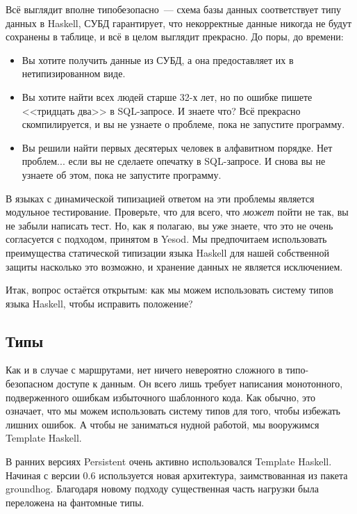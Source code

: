 Всё выглядит вполне типобезопасно~--- схема базы данных соответствует типу
данных в Haskell, СУБД гарантирует, что некорректные данные никогда не будут
сохранены в таблице, и всё в целом выглядит прекрасно. До поры, до времени:
\begin{itemize}
  \item Вы хотите получить данные из СУБД, а она предоставляет их в
      нетипизированном виде.

  \item Вы хотите найти всех людей старше 32-х лет, но по ошибке пишете
      <<тридцать два>> в SQL-запросе. И знаете что? Всё прекрасно
      скомпилируется, и вы не узнаете о проблеме, пока не запустите программу.

  \item Вы решили найти первых десятерых человек в алфавитном порядке. Нет
      проблем... если вы не сделаете опечатку в SQL-запросе. И снова вы не
      узнаете об этом, пока не запустите программу.
\end{itemize}

В языках с динамической типизацией ответом на эти проблемы является модульное
тестирование. Проверьте, что для всего, что \emph{может} пойти не так, вы не
забыли написать тест. Но, как я полагаю, вы уже знаете, что это не очень
согласуется с подходом, принятом в Yesod. Мы предпочитаем использовать
преимущества статической типизации языка Haskell для нашей собственной защиты
насколько это возможно, и хранение данных не является исключением.

Итак, вопрос остаётся открытым: как мы можем использовать систему типов языка
Haskell, чтобы исправить положение?

\subsection{Типы}
Как и в случае с маршрутами, нет ничего невероятно сложного в типо-безопасном
доступе к данным. Он всего лишь требует написания монотонного, подверженного
ошибкам избыточного шаблонного кода. Как обычно, это означает, что мы можем
использовать систему типов для того, чтобы избежать лишних ошибок. А чтобы не
заниматься нудной работой, мы вооружимся Template Haskell.

\begin{remark}
    В ранних версиях Persistent очень активно использовался Template Haskell.
    Начиная с версии 0.6 используется новая архитектура, заимствованная из
    пакета groundhog. Благодаря новому подходу существенная часть нагрузки была
    переложена на фантомные типы.
\end{remark}

